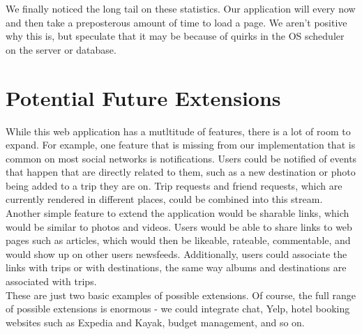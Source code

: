 \documentclass[11pt]{amsart}
\begin{document}
We finally noticed the long tail on these statistics. Our application will every now and then take
a preposterous amount of time to load a page. We aren't positive why this is, but speculate that it
may be because of quirks in the OS scheduler on the server or database. \\

\section{Potential Future Extensions}
While this web application has a mutltitude of features, there is a lot of room to expand. For example, one
feature that is missing from our implementation that is common on most social networks is notifications.
Users could be notified of events that happen that are directly related to them, such as a new
destination or photo being added to a trip they are on. Trip requests and friend requests, which are currently
rendered in different places, could be combined into this stream.\\

Another simple feature to extend the application would be sharable links, which would be similar to 
photos and videos. Users would be able to share links to web pages such as articles, which would then
be likeable, rateable, commentable, and would show up on other users newsfeeds. Additionally, users
could associate the links with trips or with destinations, the same way albums and destinations are 
associated with trips.\\

These are just two basic examples of possible extensions. Of course, the full range of possible extensions is
enormous - we could integrate chat, Yelp, hotel booking websites such as Expedia and Kayak, budget management, 
and so on.
\end{document}

